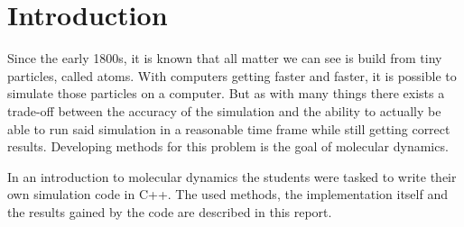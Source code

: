 \chapter{Introduction}
\begin{comment}
- atoms maybe as the first bullet point 1800 know but also the greeks knew, but was kinda forgotten again. Do i need a cite there?! nah
- with stronger computers it became possible to simulate  the atoms, but kinda computationally expensive, methods have to be developed to simplifyc  stuff
- mention like the goal of this, build an own smol simulation
- introduction to md simulation 
- weird mix between chemistry, physics and computation + a lot of programming
- written in c++ instead of the standard python stuff 
- from a developers perspective programming in python will most likely take less time, while programming in be a bit faster (and more complicated)
\end{comment}


Since the early 1800s, it is known that all matter we can see is build from tiny particles, called atoms. With computers getting faster and faster, it is possible to simulate those particles on a computer. But as with many things there exists a trade-off between the accuracy of the simulation and the ability to actually be able to run said simulation in a reasonable time frame while still getting correct results. 
Developing methods for this problem is the goal of molecular dynamics. 
\par 
In an introduction to molecular dynamics the students were tasked to write their own simulation code in C++. The used methods, the implementation itself and the results gained by the code are described in this report. 